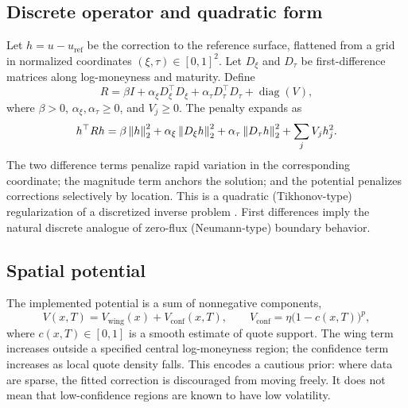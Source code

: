 \documentclass[11pt,a4paper]{article}
\begin{document}
\subsection{Discrete operator and quadratic form}
Let $h=u-u_{\mathrm{ref}}$ be the correction to the reference surface, flattened from a grid in normalized coordinates $(\xi,\tau)\in[0,1]^2$. Let $D_\xi$ and $D_\tau$ be first-difference matrices along log-moneyness and maturity. Define
\begin{equation}\label{eq:R}
 R=\beta I+\alpha_\xi D_\xi^\top D_\xi+
   \alpha_\tau D_\tau^\top D_\tau+\operatorname{diag}(V),
\end{equation}
where $\beta>0$, $\alpha_\xi,\alpha_\tau\geq0$, and $V_j\geq0$. The penalty expands as
\begin{equation}\label{eq:energy-discrete}
 h^\top Rh=\beta\left\lVert h\right\rVert_2^2+
 \alpha_\xi\left\lVert D_\xi h\right\rVert_2^2+
 \alpha_\tau\left\lVert D_\tau h\right\rVert_2^2+
 \sum_jV_jh_j^2.
\end{equation}
The two difference terms penalize rapid variation in the corresponding coordinate; the magnitude term anchors the solution; and the potential penalizes corrections selectively by location. This is a quadratic (Tikhonov-type) regularization of a discretized inverse problem \cite{TikhonovArsenin1977}. First differences imply the natural discrete analogue of zero-flux (Neumann-type) boundary behavior.

\subsection{Spatial potential}
The implemented potential is a sum of nonnegative components,
\begin{equation}\label{eq:potential}
 V(x,T)=V_{\mathrm{wing}}(x)+V_{\mathrm{conf}}(x,T),\qquad
 V_{\mathrm{conf}}=\eta\bigl(1-c(x,T)\bigr)^p,
\end{equation}
where $c(x,T)\in[0,1]$ is a smooth estimate of quote support. The wing term increases outside a specified central log-moneyness region; the confidence term increases as local quote density falls. This encodes a cautious prior: where data are sparse, the fitted correction is discouraged from moving freely. It does not mean that low-confidence regions are known to have low volatility.
\end{document}
